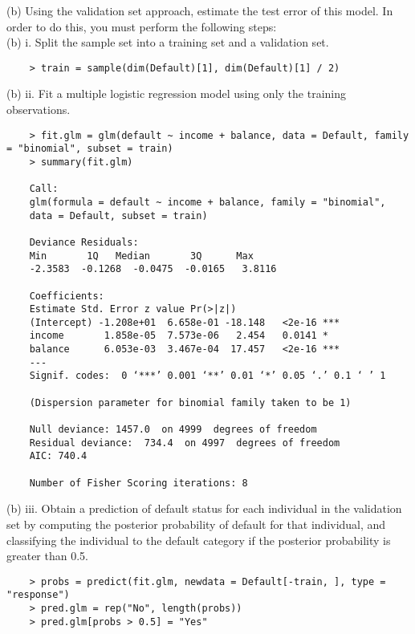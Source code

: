 \documentclass{article}
\begin{document}
\newpage
(b) Using the validation set approach, estimate the test error of this model. In order to do this, you must perform the following steps:\\

(b) i. Split the sample set into a training set and a validation set.
     
\begin{program}
	\begin{verbatim}
	> train = sample(dim(Default)[1], dim(Default)[1] / 2)
	\end{verbatim}
\end{program}

(b) ii. Fit a multiple logistic regression model using only the training observations.

\begin{program}
	\begin{verbatim}
	> fit.glm = glm(default ~ income + balance, data = Default, family = "binomial", subset = train)
	> summary(fit.glm)
	
	Call:
	glm(formula = default ~ income + balance, family = "binomial", 
	data = Default, subset = train)
	
	Deviance Residuals: 
	Min       1Q   Median       3Q      Max  
	-2.3583  -0.1268  -0.0475  -0.0165   3.8116  
	
	Coefficients:
	Estimate Std. Error z value Pr(>|z|)    
	(Intercept) -1.208e+01  6.658e-01 -18.148   <2e-16 ***
	income       1.858e-05  7.573e-06   2.454   0.0141 *  
	balance      6.053e-03  3.467e-04  17.457   <2e-16 ***
	---
	Signif. codes:  0 ‘***’ 0.001 ‘**’ 0.01 ‘*’ 0.05 ‘.’ 0.1 ‘ ’ 1
	
	(Dispersion parameter for binomial family taken to be 1)
	
	Null deviance: 1457.0  on 4999  degrees of freedom
	Residual deviance:  734.4  on 4997  degrees of freedom
	AIC: 740.4
	
	Number of Fisher Scoring iterations: 8
	\end{verbatim}
\end{program}


(b) iii. Obtain a prediction of default status for each individual in the validation set by computing the posterior probability of default for that individual, and classifying the individual to the default category if the posterior probability is greater than 0.5.
\begin{program}
	\begin{verbatim}
	> probs = predict(fit.glm, newdata = Default[-train, ], type = "response")
	> pred.glm = rep("No", length(probs))
	> pred.glm[probs > 0.5] = "Yes"	
	\end{verbatim}
\end{program}
\end{document}
